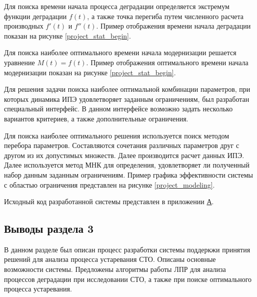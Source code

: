 Для поиска времени начала процесса деградации определяется экстремум функции деградации $f(t)$, 
а также точка перегиба путем численного расчета производных $f'(t)$ и $f''(t)$.
Пример отображения времени начала деградации показан на рисунке \ref{project_stat_begin}.


Для поиска наиболее оптимального времени начала модернизации решается уравнение $M(t)=f(t)$. 
Пример отображения оптимального времени начала модернизации показан на рисунке \ref{project_stat_begin}.

 
Для решения задачи поиска наиболее оптимальной комбинации параметров, при которых динамика ИПЭ удовлетворяет заданным ограничениям, был разработан специальный интерфейс. 
В данном интерфейсе возможно задать несколько вариантов критериев, а также дополнительные ограничения.

Для поиска наиболее оптимального решения используется поиск методом перебора параметров. 
Составляются сочетания различных параметров друг с другом из их допустимых множеств. 
Далее производится расчет данных ИПЭ. 
Далее используется метод МНК для определения, удовлетворяет ли полученный набор данным заданным ограничениям.
Пример графика эффективности системы с областью ограничения представлен на рисунке \ref{project_modeling}.


Исходный код разработанной системы представлен в приложении \hyperlink{app-a}{А}.

\subsection*{Выводы раздела 3}
В данном разделе был описан процесс разработки системы поддеркжи принятия решений для анализа процесса устаревания СТО.
Описаны основные возможности системы. 
Предложены алгоритмы работы ЛПР для анализа процессов деградации при исследовании СТО, а также при поиске оптимального процесса устаревания.


